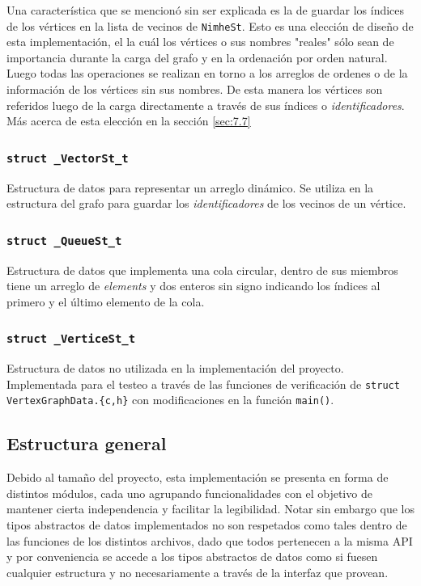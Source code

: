 \documentclass[11pt,a4paper]{article}
\theoremstyle{plain}
\begin{document}
\begin{itemize}
Una característica que se mencionó sin ser explicada es la de guardar los índices de los vértices en la lista de vecinos de \texttt{NimheSt}. Esto es una elección de diseño de esta implementación, el la cuál los vértices o sus nombres "reales" sólo sean de importancia durante la carga del grafo y en la ordenación por orden natural. Luego todas las operaciones se realizan en torno a los arreglos de ordenes o de la información de los vértices sin sus nombres. De esta manera los vértices son referidos luego de la carga directamente a través de sus índices o \emph{identificadores}. Más acerca de esta elección en la sección \ref{sec:7.7}

\end{itemize}
	
		\subsubsection{\texttt{struct \_VectorSt\_t}}

Estructura de datos para representar un arreglo dinámico\cite{7}. Se utiliza en la estructura del grafo para guardar los \emph{identificadores} de los vecinos de un vértice.

		\subsubsection{\texttt{struct \_QueueSt\_t}}

Estructura de datos que implementa una cola circular\cite{8}, dentro de sus miembros tiene un arreglo de \emph{elements} y dos enteros sin signo indicando los índices al primero y el último elemento de la cola.

		\subsubsection{\texttt{struct \_VerticeSt\_t}}

Estructura de datos no utilizada en la implementación del proyecto. Implementada para el testeo a través de las funciones de verificación de \texttt{struct VertexGraphData.\{c,h\}} con modificaciones en la función \texttt{main()}.

		\subsection{Estructura general}

Debido al tamaño del proyecto, esta implementación se presenta en forma de distintos módulos, cada uno agrupando funcionalidades con el objetivo de mantener cierta independencia y facilitar la legibilidad. Notar sin embargo que los tipos abstractos de datos implementados no son respetados como tales dentro de las funciones de los distintos archivos, dado que todos pertenecen a la misma API y por conveniencia se accede a los tipos abstractos de datos como si fuesen cualquier estructura y no necesariamente a través de la interfaz que provean.
\end{document}
